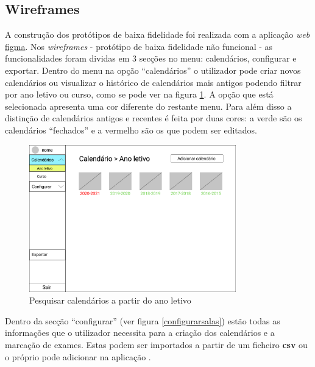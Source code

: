 \documentclass[11pt, twoside]{report}
\begin{document}
	\subsection{Wireframes}
	
	A construção dos protótipos de baixa fidelidade foi realizada com a aplicação \textit{web} \href{https://www.figma.com/}{figma}.
	Nos \textit{wireframes} - protótipo de baixa fidelidade não funcional - as funcionalidades foram dividas em 3 secções no menu: calendários, configurar e exportar.
	Dentro do menu na opção ``calendários'' o utilizador pode criar novos calendários ou visualizar o histórico de calendários mais antigos podendo filtrar por ano letivo ou curso, como se pode ver na figura \ref{menucalendario}.
	A opção que está selecionada apresenta uma cor diferente do restante menu.
	Para além disso a distinção de calendários antigos e recentes é feita por duas cores: a verde são os calendários ``fechados'' e a vermelho são os que podem ser editados. 
	
	\begin{figure}[H] 
		\centering 
		\includegraphics[width=0.8\textwidth,height=0.8\textheight,keepaspectratio]{image/prototipowireframes/pesquisacalendarioanoletivo}
		\caption{Pesquisar calendários a partir do ano letivo}
		\label{menucalendario}
	\end{figure}
	
	Dentro da secção ``configurar'' (ver figura \ref{configurarsalas}) estão todas as informações que o utilizador necessita para a criação dos calendários e a marcação de exames. Estas podem ser importados a partir de um ficheiro \textbf{csv} ou o próprio pode adicionar na aplicação . 
	
\end{document}
